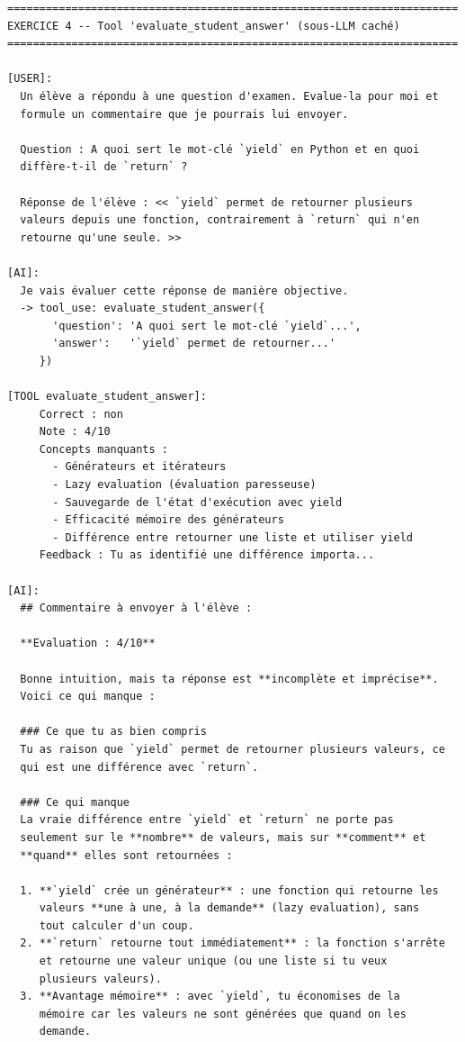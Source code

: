 \documentclass[11pt,a4paper]{article}
\begin{document}
\begin{tcolorbox}[
  colback=white,
  colframe=black!50,
  coltitle=black,
  fonttitle=\footnotesize\bfseries,
  fontupper=\footnotesize,
  title=Sortie de l'exécution,
  breakable,
]
\begin{verbatim}
======================================================================
EXERCICE 4 -- Tool 'evaluate_student_answer' (sous-LLM caché)
======================================================================

[USER]:
  Un élève a répondu à une question d'examen. Evalue-la pour moi et
  formule un commentaire que je pourrais lui envoyer.

  Question : A quoi sert le mot-clé `yield` en Python et en quoi
  diffère-t-il de `return` ?

  Réponse de l'élève : << `yield` permet de retourner plusieurs
  valeurs depuis une fonction, contrairement à `return` qui n'en
  retourne qu'une seule. >>

[AI]:
  Je vais évaluer cette réponse de manière objective.
  -> tool_use: evaluate_student_answer({
       'question': 'A quoi sert le mot-clé `yield`...',
       'answer':   '`yield` permet de retourner...'
     })

[TOOL evaluate_student_answer]:
     Correct : non
     Note : 4/10
     Concepts manquants :
       - Générateurs et itérateurs
       - Lazy evaluation (évaluation paresseuse)
       - Sauvegarde de l'état d'exécution avec yield
       - Efficacité mémoire des générateurs
       - Différence entre retourner une liste et utiliser yield
     Feedback : Tu as identifié une différence importa...

[AI]:
  ## Commentaire à envoyer à l'élève :

  **Evaluation : 4/10**

  Bonne intuition, mais ta réponse est **incomplète et imprécise**.
  Voici ce qui manque :

  ### Ce que tu as bien compris
  Tu as raison que `yield` permet de retourner plusieurs valeurs, ce
  qui est une différence avec `return`.

  ### Ce qui manque
  La vraie différence entre `yield` et `return` ne porte pas
  seulement sur le **nombre** de valeurs, mais sur **comment** et
  **quand** elles sont retournées :

  1. **`yield` crée un générateur** : une fonction qui retourne les
     valeurs **une à une, à la demande** (lazy evaluation), sans
     tout calculer d'un coup.
  2. **`return` retourne tout immédiatement** : la fonction s'arrête
     et retourne une valeur unique (ou une liste si tu veux
     plusieurs valeurs).
  3. **Avantage mémoire** : avec `yield`, tu économises de la
     mémoire car les valeurs ne sont générées que quand on les
     demande.


\end{verbatim}
\end{tcolorbox}
\end{document}
